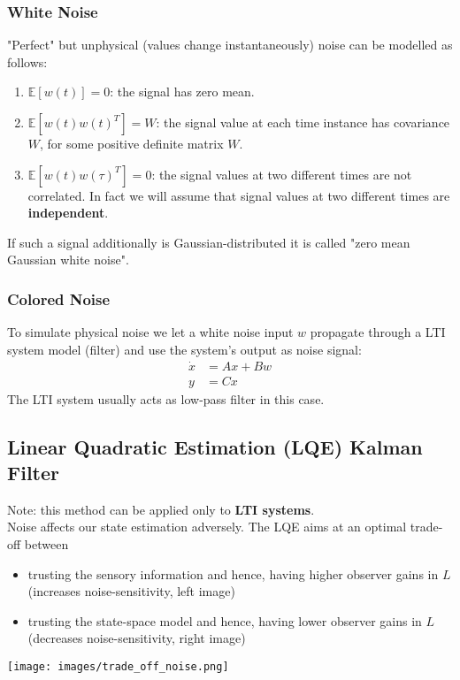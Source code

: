 \subsubsection{White Noise}
"Perfect" but unphysical (values change instantaneously) noise can be modelled as follows:
\begin{enumerate}
    \item $\mathbb{E}[w(t)]=0$: the signal has zero mean.
    \item $\mathbb{E}[w(t)w(t)^T]=W$: the signal value at each time instance has covariance $W$, for some positive definite matrix $W.$
    \item $\mathbb{E}[w(t)w(\tau)^T]=0$: the signal values at two different times are not correlated. In fact we will assume that signal values at two different times are \textbf{independent}.
\end{enumerate}
If such a signal additionally is Gaussian-distributed it is called "zero mean Gaussian white noise".

\subsubsection{Colored Noise}
To simulate physical noise we let a white noise input $w$ propagate through a LTI system model (filter) and use the system's output as noise signal:
\begin{align*}
    \dot{x} & =Ax+Bw \\
    y       & = Cx
\end{align*}
The LTI system usually acts as low-pass filter in this case.


\subsection{Linear Quadratic Estimation (LQE) Kalman Filter}
Note: this method can be applied only to \textbf{LTI systems}.\\
Noise affects our state estimation adversely. The LQE aims at an optimal trade-off between
\begin{itemize}
    \item trusting the sensory information and hence, having higher observer gains in $L$ (increases noise-sensitivity, left image)
    \item trusting the state-space model and hence, having lower observer gains in $L$ (decreases noise-sensitivity, right image)
\end{itemize}
\begin{center}
    \texttt{[image: images/trade\_off\_noise.png]}
\end{center}


